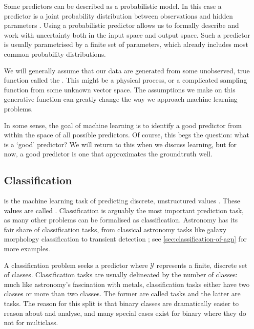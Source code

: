         Some predictors can be described as a probabilistic model. In this case a predictor is a joint probability distribution between observations and hidden parameters \citep{deisenroth_mathematics_2020}. Using a probabilistic predictor allows us to formally describe and work with uncertainty both in the input space and output space. Such a predictor is usually parametrised by a finite set of parameters, which already includes most common probability distributions.

        We will generally assume that our data are generated from some unobserved, true function called the . This might be a physical process, or a complicated sampling function from some unknown vector space. The assumptions we make on this generative function can greatly change the way we approach machine learning problems.

        In some sense, the goal of machine learning is to identify a good predictor from within the space of all possible predictors. Of course, this begs the question: what is a `good' predictor? We will return to this when we discuss learning, but for now, a good predictor is one that approximates the groundtruth well.

    \subsection{Classification}
    \label{sec:classification}

         is the machine learning task of predicting discrete, unstructured values \citep{deisenroth_mathematics_2020}. These values are called . Classification is arguably the most important prediction task, as many other problems can be formalised as classification. Astronomy has its fair share of classification tasks, from classical astronomy tasks like galaxy morphology classification \citep[appearing in machine learning literature as e.g.][]{dieleman15cnn} to transient detection \citep[e.g.][]{scalzo_skymapper_2017}; see \autoref{sec:classification-of-agn} for more examples.

        A classification problem seeks a predictor where $\mathcal Y$ represents a finite, discrete set of classes. Classification tasks are usually delineated by the number of classes: much like astronomy's fascination with metals, classification tasks either have two classes or more than two classes. The former are called  tasks and the latter are  tasks. The reason for this split is that binary classes are dramatically easier to reason about and analyse, and many special cases exist for binary where they do not for multiclass.


